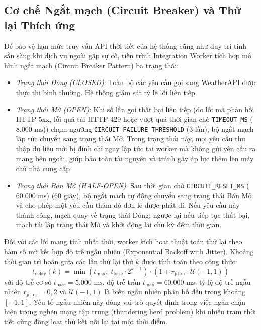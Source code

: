 \subsection{Cơ chế Ngắt mạch (Circuit Breaker) và Thử lại Thích ứng}
Để bảo vệ hạn mức truy vấn API thời tiết của hệ thống cũng như duy trì tính sẵn sàng khi dịch vụ ngoài gặp sự cố, tiến trình Integration Worker tích hợp mô hình ngắt mạch (Circuit Breaker Pattern) ba trạng thái:
\begin{itemize}
    \item[-] \textit{Trạng thái Đóng (CLOSED)}: Toàn bộ các yêu cầu gọi sang WeatherAPI được thực thi bình thường. Hệ thống giám sát tỷ lệ lỗi liên tiếp.
    \item[-] \textit{Trạng thái Mở (OPEN)}: Khi số lần gọi thất bại liên tiếp (do lỗi mã phản hồi HTTP 5xx, lỗi quá tải HTTP 429 hoặc vượt quá thời gian chờ \texttt{TIMEOUT\_MS} ($8.000\text{ ms}$)) chạm ngưỡng \texttt{CIRCUIT\_FAILURE\_}\allowbreak\texttt{THRESHOLD} ($3$ lần), bộ ngắt mạch lập tức chuyển sang trạng thái Mở. Trong trạng thái này, mọi yêu cầu thu thập dữ liệu mới bị đình chỉ ngay lập tức tại worker mà không gửi yêu cầu ra mạng bên ngoài, giúp bảo toàn tài nguyên và tránh gây áp lực thêm lên máy chủ nhà cung cấp.
    \item[-] \textit{Trạng thái Bán Mở (HALF-OPEN)}: Sau thời gian chờ \texttt{CIRCUIT\_RESET\_MS} ($60.000\text{ ms}$) (60 giây), bộ ngắt mạch tự động chuyển sang trạng thái Bán Mở và cho phép một yêu cầu thăm dò đơn lẻ được phát đi. Nếu yêu cầu này thành công, mạch quay về trạng thái Đóng; ngược lại nếu tiếp tục thất bại, mạch tái lập trạng thái Mở và khởi động lại chu kỳ đếm thời gian.
\end{itemize}

Đối với các lỗi mang tính nhất thời, worker kích hoạt thuật toán thử lại theo hàm số mũ kết hợp độ trễ ngẫu nhiên (Exponential Backoff with Jitter). Khoảng thời gian trì hoãn giữa các lần thử lại thứ $k$ được tính toán theo công thức:
\begin{equation}
\label{eq:backoff_jitter}
t_{\text{delay}}(k) = \min\left(t_{\max}, \; t_{\text{base}} \cdot 2^{k-1}\right) \cdot \left(1 + r_{\text{jitter}} \cdot \mathcal{U}(-1, 1)\right)
\end{equation}
với độ trễ cơ sở $t_{\text{base}} = 5.000\text{ ms}$, độ trễ trần $t_{\max} = 60.000\text{ ms}$, tỷ lệ độ trễ ngẫu nhiên $r_{\text{jitter}} = 0{,}2$ và $\mathcal{U}(-1, 1)$ là biến ngẫu nhiên phân bố đều trong khoảng $[-1, 1]$. Yếu tố ngẫu nhiên này đóng vai trò quyết định trong việc ngăn chặn hiện tượng nghẽn mạng tập trung (thundering herd problem) khi nhiều trạm thời tiết cùng đồng loạt thử kết nối lại tại một thời điểm.

